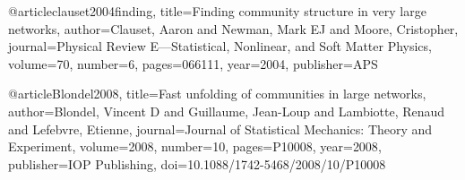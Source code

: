 @article{clauset2004finding,
  title={Finding community structure in very large networks},
  author={Clauset, Aaron and Newman, Mark EJ and Moore, Cristopher},
  journal={Physical Review E—Statistical, Nonlinear, and Soft Matter Physics},
  volume={70},
  number={6},
  pages={066111},
  year={2004},
  publisher={APS}
}

@article{Blondel2008,
  title={Fast unfolding of communities in large networks},
  author={Blondel, Vincent D and Guillaume, Jean-Loup and Lambiotte, Renaud and Lefebvre, Etienne},
  journal={Journal of Statistical Mechanics: Theory and Experiment},
  volume={2008},
  number={10},
  pages={P10008},
  year={2008},
  publisher={IOP Publishing},
  doi={10.1088/1742-5468/2008/10/P10008}
}
